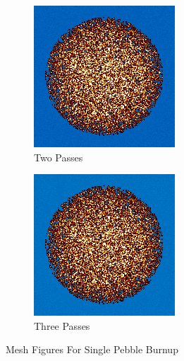 \begin{figure}[H]
\begin{subfigure}{0.45\textwidth}
  \includegraphics[width=0.95\linewidth]{figures/burn-20-bstep2}
  \caption{Two Passes}
  \label{fig:bstep2}
\end{subfigure}%
%
\begin{subfigure}{0.45\textwidth}
  \includegraphics[width=0.95\linewidth]{figures/burn-20-bstep3}
  \caption{Three Passes}
  \label{fig:bstep3}
\end{subfigure}%

\caption{Mesh Figures For Single Pebble Burnup}
\end{figure}

